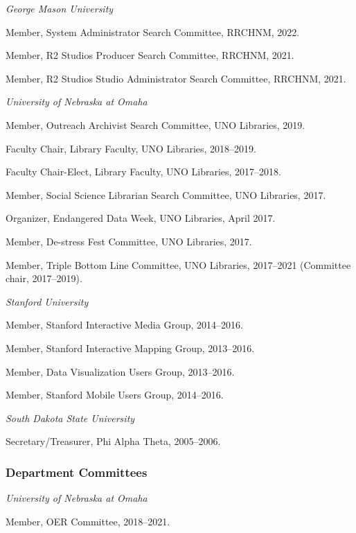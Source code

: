 \emph{George Mason University}

Member, System Administrator Search Committee, RRCHNM, 2022.

Member, R2 Studios Producer Search Committee, RRCHNM, 2021.

Member, R2 Studios Studio Administrator Search Committee, RRCHNM, 2021.

\vspace{.4cm}

\emph{University of Nebraska at Omaha}

Member, Outreach Archivist Search Committee, UNO Libraries, 2019.

Faculty Chair, Library Faculty, UNO Libraries, 2018--2019.

Faculty Chair-Elect, Library Faculty, UNO Libraries, 2017--2018.

Member, Social Science Librarian Search Committee, UNO Libraries, 2017.

Organizer, Endangered Data Week, UNO Libraries, April 2017.

Member, De-stress Fest Committee, UNO Libraries, 2017.

Member, Triple Bottom Line Committee, UNO Libraries, 2017--2021
(Committee chair, 2017--2019).

\vspace{.4cm}

\emph{Stanford University}

Member, Stanford Interactive Media Group, 2014--2016.

Member, Stanford Interactive Mapping Group, 2013--2016.

Member, Data Visualization Users Group, 2013--2016.

Member, Stanford Mobile Users Group, 2014--2016.

\vspace{.4cm}

\emph{South Dakota State University}

Secretary/Treasurer, Phi Alpha Theta, 2005--2006.

\hypertarget{department-committees}{%
\subsubsection{Department Committees}\label{department-committees}}

\emph{University of Nebraska at Omaha}

Member, OER Committee, 2018--2021.

\vspace{.4cm}

